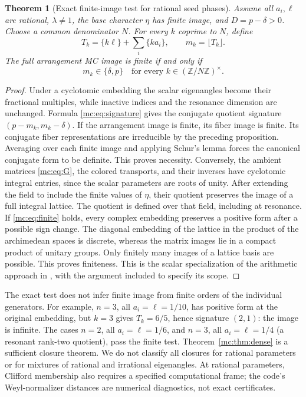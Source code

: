 \documentclass[11pt,a4paper]{article}
\newtheorem{theorem}{Theorem}[section]
\theoremstyle{remark}\newtheorem{remark}[theorem]{Remark}
\begin{document}
\begin{theorem}[Exact finite-image test for rational seed phases]
Assume all $a_i,\ell$ are rational, $\lambda\ne1$, the base character
$\eta$ has finite image, and $D=p-\delta>0$. Choose a common denominator
$N$. For every $k$ coprime to $N$, define
\[
 T_k=\{k\ell\}+\sum_i\{ka_i\},\qquad m_k=\lfloor T_k\rfloor.
\]
The full arrangement MC image is finite if and only if
\begin{equation}\label{mc:eq:finite}
 m_k\in\{\delta,p\}\quad\text{for every }k\in(\mathbb Z/N\mathbb Z)^\times.
\end{equation}
\end{theorem}
\begin{proof}
Under a cyclotomic embedding the scalar eigenangles become their
fractional multiples, while inactive indices and the resonance dimension
are unchanged. Formula \eqref{mc:eq:signature} gives the conjugate quotient
signature $(p-m_k,m_k-\delta)$.
If the arrangement image is finite, its fiber image is finite. Its
conjugate fiber representations are irreducible by the preceding
proposition. Averaging over each finite image and applying Schur's lemma
forces the canonical conjugate form to be definite. This proves necessity.
Conversely, the ambient matrices \eqref{mc:eq:G}, the colored transports,
and their inverses have cyclotomic integral entries, since the scalar
parameters are roots of unity. After extending the field to include
the finite values of $\eta$, their quotient preserves the image of a
full integral lattice. The quotient is defined over that field, including
at resonance. If \eqref{mc:eq:finite} holds, every complex embedding preserves
a positive form after a possible sign change. The diagonal embedding
of the lattice in the product of the archimedean spaces is discrete,
whereas the matrix images lie in a compact product of unitary groups.
Only finitely many images of a lattice basis are possible. This proves
finiteness. This is the scalar specialization of the arithmetic approach
in \cite{NegamiFinite}, with the argument included to specify its scope.
\end{proof}

The exact test does not infer finite image from finite orders of the
individual generators. For example, $n=3$, all $a_i=\ell=1/10$, has
positive form at the original embedding, but $k=3$ gives
$T_k=6/5$, hence signature $(2,1)$: the image is infinite.
The cases $n=2$, all $a_i=\ell=1/6$, and $n=3$, all
$a_i=\ell=1/4$ (a resonant rank-two quotient), pass the finite test.
Theorem~\ref{mc:thm:dense} is a sufficient closure theorem. We do not
classify all closures for rational parameters or for mixtures of
rational and irrational eigenangles. At rational parameters, Clifford
membership also requires a specified computational frame; the code's
Weyl-normalizer distances are numerical diagnostics, not exact certificates.
\end{document}
